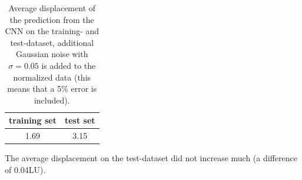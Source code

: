 \begin{table}[h]
    \centering
    \begin{tabular}{|c|c|}
    \hline
    training set & test set\\
    \hline
    1.69 & 3.15 \\
    \hline
    \end{tabular}
    \caption{Average displacement of the prediction from the CNN on the training- and test-dataset, additional Gaussian noise with $\sigma=0.05$ is added to the normalized data (this means that a 5\% error is included).}
    \label{tab:noise}
\end{table}

The average displacement on the test-dataset did not increase much (a difference of 0.04LU).
